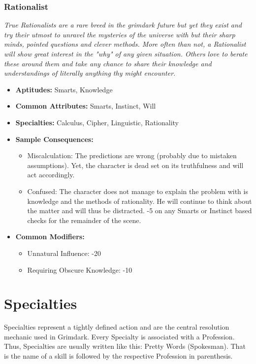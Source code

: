  \subsubsection{Rationalist}\label{Rationalist}
 \textit{True Rationalists are a rare breed in the grimdark future but yet they exist and try their utmost to unravel the mysteries of the universe with but their sharp minds, pointed questions and clever methods.
 More often than not, a Rationalist will show great interest in the "why" of any given situation.
 Others love to berate these around them and take any chance to share their knowledge and understandings of literally anything thy might encounter.}
 \begin{itemize}
 	\item \textbf{Aptitudes:} Smarts, Knowledge
 	\item \textbf{Common Attributes:} Smarts, Instinct, Will
 	\item \textbf{Specialties:} Calculus, Cipher, Linguistic, Rationality
 	\item \textbf{Sample Consequences:} 
 	\begin{itemize}
 		\item Miscalculation: The predictions are wrong (probably due to mistaken assumptions). Yet, the character is dead set on its truthfulness and will act accordingly.
 		\item Confused: The character does not manage to explain the problem with is knowledge and the methods of rationality. He will continue to think about the matter and will thus be distracted. -5 on any Smarts or Instinct based checks for the remainder of the scene.
 	\end{itemize}
 	\item \textbf{Common Modifiers:}
 	\begin{itemize}
 		\item Unnatural Influence: -20
 		\item Requiring Obscure Knowledge: -10
 	\end{itemize}
 \end{itemize}


\section{Specialties}%
\label{sec:Specialties}
Specialties represent a tightly defined action and are the central resolution mechanic used in Grimdark. 
Every Specialty is associated with a Profession.
Thus, Specialties are usually written like this: Pretty Words (Spokesman).
That is the name of a skill is followed by the respective Profession in parenthesis.

